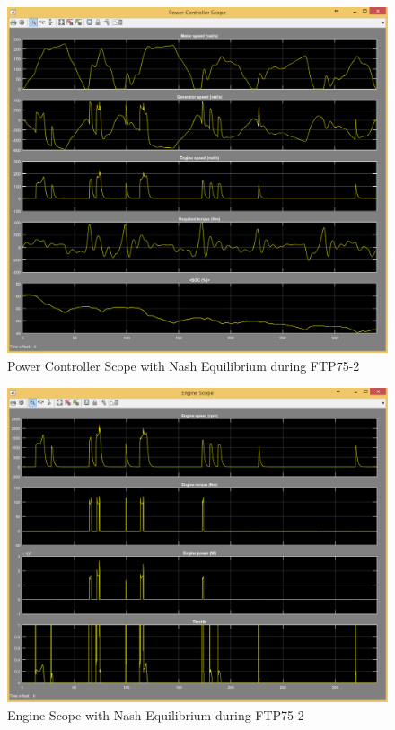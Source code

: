 \begin{figure}[h]
\centering
\includegraphics[scale=0.4]{figures/NashEquilibrium/FTP75-2/powerController13Juni}
\caption{Power Controller Scope with Nash Equilibrium during FTP75-2}
\label{fig:pcne2}
\end{figure}

\begin{figure}[h]
\centering
\includegraphics[scale=0.37]{figures/NashEquilibrium/FTP75-2/engine13Juni}
\caption{Engine Scope with Nash Equilibrium during FTP75-2}
\label{fig:ene2}
\end{figure}

